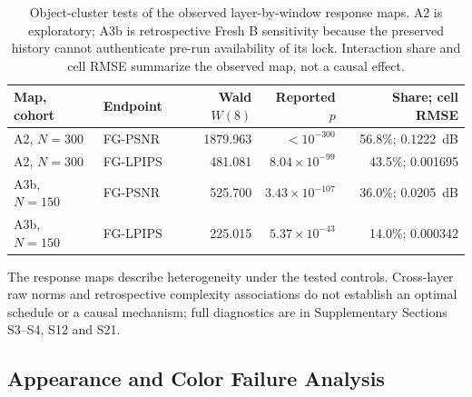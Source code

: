 \documentclass[times,twocolumn,final]{elsarticle}
\providecommand{\DIFadd}[1]{{\protect\color{blue} \sf #1}} %
\providecommand{\DIFaddbegin}{} %
\providecommand{\DIFaddend}{} %
\providecommand{\DIFaddFL}[1]{\DIFadd{#1}} %
\providecommand{\DIFaddbeginFL}{\DIFaddbegin} %
\providecommand{\DIFaddendFL}{\DIFaddend} %
\renewcommand{\DIFaddbeginFL}{}
\renewcommand{\DIFaddendFL}{}
\renewcommand{\DIFaddFL}[1]{#1}
\begin{document}
\begin{table}[t]
\centering
  \DIFaddbeginFL \scriptsize
\setlength{\tabcolsep}{3pt}
\caption{Object-cluster tests of the observed layer-by-window response maps. A2 is exploratory; A3b is retrospective Fresh B sensitivity because the preserved history cannot authenticate pre-run availability of its lock. Interaction share and cell RMSE summarize the observed map, not a causal effect.}
\label{tab:layerwindow-main}
\begin{tabular}{llrrr}
\DIFaddendFL \toprule
  \DIFaddbeginFL \DIFaddFL{Map, cohort }\DIFaddendFL &   \DIFaddbeginFL \DIFaddFL{Endpoint }\DIFaddendFL &   \DIFaddbeginFL \DIFaddFL{Wald $W(8)$ }\DIFaddendFL &   \DIFaddbeginFL \DIFaddFL{Reported $p$ }& \DIFaddFL{Share; cell RMSE }\DIFaddendFL \\
\midrule
  \DIFaddbeginFL \DIFaddFL{A2, $N=300$ }\DIFaddendFL &   \DIFaddbeginFL \DIFaddFL{FG-PSNR }\DIFaddendFL &   \DIFaddbeginFL \DIFaddFL{1879.963 }\DIFaddendFL &   \DIFaddbeginFL \DIFaddFL{$<10^{-300}$ }& \DIFaddFL{56.8\%; 0.1222~dB }\DIFaddendFL \\
  \DIFaddbeginFL \DIFaddFL{A2, $N=300$ }\DIFaddendFL &   \DIFaddbeginFL \DIFaddFL{FG-LPIPS }\DIFaddendFL &   \DIFaddbeginFL \DIFaddFL{481.081 }\DIFaddendFL &   \DIFaddbeginFL \DIFaddFL{$8.04\times10^{-99}$ }& \DIFaddFL{43.5\%; 0.001695 }\DIFaddendFL \\
  \DIFaddbeginFL \DIFaddFL{A3b, $N=150$ }\DIFaddendFL &   \DIFaddbeginFL \DIFaddFL{FG-PSNR }\DIFaddendFL &   \DIFaddbeginFL \DIFaddFL{525.700 }\DIFaddendFL &   \DIFaddbeginFL \DIFaddFL{$3.43\times10^{-107}$ }& \DIFaddFL{36.0\%; 0.0205~dB }\\
\DIFaddFL{A3b, $N=150$ }& \DIFaddFL{FG-LPIPS }& \DIFaddFL{225.015 }& \DIFaddFL{$5.37\times10^{-43}$ }& \DIFaddFL{14.0\%; 0.000342 }\DIFaddendFL \\
\bottomrule
\end{tabular}
\end{table}

  \DIFaddbegin \DIFadd{The response maps describe heterogeneity under the tested controls. Cross-layer raw norms and retrospective complexity associations do not establish an optimal schedule or a causal mechanism; full diagnostics are in Supplementary Sections S3--S4, S12 and S21.
}

\subsection{Appearance and Color Failure Analysis}
\label{subsec:appearance-color}
\end{document}
